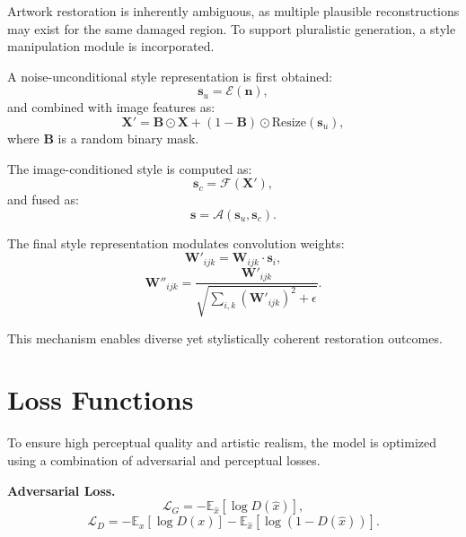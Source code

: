 \documentclass[12pt, twoside]{report}
\begin{document}
Artwork restoration is inherently ambiguous, as multiple plausible reconstructions may exist for the same damaged region. To support pluralistic generation, a style manipulation module is incorporated.

A noise-unconditional style representation is first obtained:
\begin{equation}
\mathbf{s}_u = \mathcal{E}(\mathbf{n}),
\end{equation}
and combined with image features as:
\begin{equation}
\mathbf{X}' = \mathbf{B} \odot \mathbf{X} + (1-\mathbf{B}) \odot \mathrm{Resize}(\mathbf{s}_u),
\end{equation}
where $\mathbf{B}$ is a random binary mask.

The image-conditioned style is computed as:
\begin{equation}
\mathbf{s}_c = \mathcal{F}(\mathbf{X}'),
\end{equation}
and fused as:
\begin{equation}
\mathbf{s} = \mathcal{A}(\mathbf{s}_u, \mathbf{s}_c).
\end{equation}

The final style representation modulates convolution weights:
\begin{equation}
\mathbf{W}'_{ijk} = \mathbf{W}_{ijk} \cdot \mathbf{s}_i,
\end{equation}
\begin{equation}
\mathbf{W}''_{ijk} =
\frac{\mathbf{W}'_{ijk}}{\sqrt{\sum_{i,k}(\mathbf{W}'_{ijk})^2 + \epsilon}}.
\end{equation}

This mechanism enables diverse yet stylistically coherent restoration outcomes.

\section{Loss Functions}

To ensure high perceptual quality and artistic realism, the model is optimized using a combination of adversarial and perceptual losses.

\textbf{Adversarial Loss.}
\begin{equation}
\mathcal{L}_G = -\mathbb{E}_{\hat{x}}[\log D(\hat{x})],
\end{equation}
\begin{equation}
\mathcal{L}_D = -\mathbb{E}_{x}[\log D(x)] -
\mathbb{E}_{\hat{x}}[\log (1 - D(\hat{x}))].
\end{equation}
\end{document}
